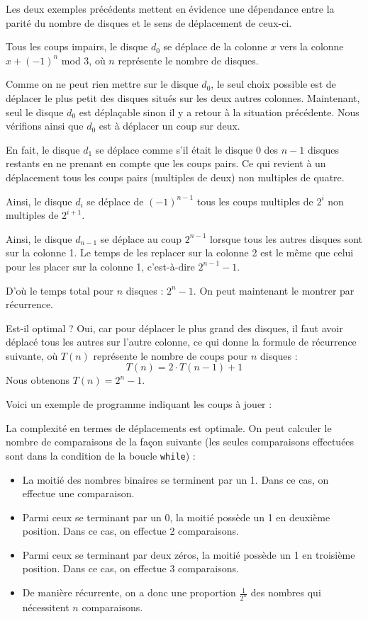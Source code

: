 \Q
Les deux exemples précédents mettent en évidence une dépendance entre la parité du nombre de disques et le sens de déplacement de ceux-ci.
\medskip

Tous les coups impairs, le disque $d_0$ se déplace de la colonne $x$ vers la colonne $x+(-1)^n$ mod 3, où $n$ représente le nombre de disques.
\medskip

Comme on ne peut rien mettre sur le disque $d_0$, le seul choix possible est de déplacer le plus petit des disques situés sur les deux autres colonnes. Maintenant, seul le disque $d_0$ est déplaçable sinon il y a retour à la situation précédente. Nous vérifions ainsi que $d_0$ est à déplacer un coup sur deux.

\Q
En fait, le disque $d_1$ se déplace comme s'il était le disque 0 des $n-1$ disques restants en ne prenant en compte que les coups pairs. Ce qui revient à un déplacement tous les coups pairs (multiples de deux) non multiples de quatre.
\medskip

Ainsi, le disque $d_i$ se déplace de $(-1)^{n-1}$ tous les coups multiples de $2^i$ non multiples de $2^{i+1}$.
\medskip

Ainsi, le disque $d_{n-1}$ se déplace au coup $2^{n-1}$ lorsque tous les autres disques sont sur la colonne 1. Le temps de les replacer sur la colonne 2 est le même que celui pour les placer sur la colonne 1, c'est-à-dire $2^{n-1}-1$.
\medskip

D'où le temps total pour $n$ disques : $2^n-1$. On peut maintenant le montrer par récurrence.
\medskip

Est-il optimal ? Oui, car pour déplacer le plus grand des disques, il faut avoir déplacé tous les autres sur l'autre colonne, ce qui donne la formule de récurrence suivante, où $T(n)$ représente le nombre de coups pour $n$ disques :
\[
    T(n) = 2\cdot T(n-1)+1
\]
Nous obtenons $T(n)=2^n-1$.
\medskip

Voici un exemple de programme indiquant les coups à jouer :



La complexité en termes de déplacements est optimale. On peut calculer le nombre de comparaisons de la façon suivante (les seules comparaisons effectuées sont dans la condition de la boucle \texttt{while}) :
\begin{itemize}
    \item La moitié des nombres binaires se terminent par un 1. Dans ce cas, on effectue une comparaison.
    \item Parmi ceux se terminant par un 0, la moitié possède un 1 en deuxième position. Dans ce cas, on effectue 2 comparaisons.
    \item Parmi ceux se terminant par deux zéros, la moitié possède un 1 en troisième position. Dans ce cas, on effectue 3 comparaisons.
    \item De manière récurrente, on a donc une proportion $\frac{1}{2^n}$ des nombres qui nécessitent $n$ comparaisons.
\end{itemize}
\medskip

